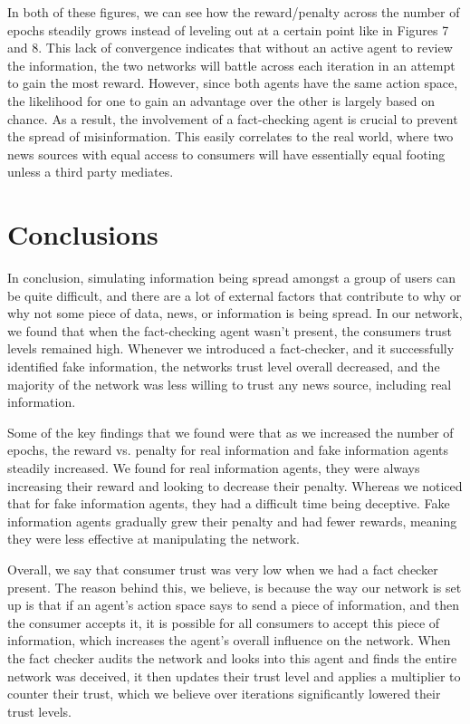\documentclass[twoside]{article}
\begin{document}
 In both of these figures, we can see how the reward/penalty across the number of epochs steadily grows instead of leveling out at a certain point like in Figures 7 and 8. This lack of convergence indicates that without an active agent to review the information, the two networks will battle across each iteration in an attempt to gain the most reward. However, since both agents have the same action space, the likelihood for one to gain an advantage over the other is largely based on chance. As a result, the involvement of a fact-checking agent is crucial to prevent the spread of misinformation. This easily correlates to the real world, where two news sources with equal access to consumers will have essentially equal footing unless a third party mediates.

 \pagebreak
\section{Conclusions}
In conclusion, simulating information being spread amongst a group of users can be quite difficult, and there are a lot of external factors that contribute to why or why not some piece of data, news, or information is being spread. In our network, we found that when the fact-checking agent wasn't present, the consumers trust levels remained high. Whenever we introduced a fact-checker, and it successfully identified fake information, the networks trust level overall decreased, and the majority of the network was less willing to trust any news source, including real information.

Some of the key findings that we found were that as we increased the number of epochs, the reward vs. penalty for real information and fake information agents steadily increased. We found for real information agents, they were always increasing their reward and looking to decrease their penalty. Whereas we noticed that for fake information agents, they had a difficult time being deceptive. Fake information agents gradually grew their penalty and had fewer rewards, meaning they were less effective at manipulating the network. 

Overall, we say that consumer trust was very low when we had a fact checker present. The reason behind this, we believe, is because the way our network is set up is that if an agent's action space says to send a piece of information, and then the consumer accepts it, it is possible for all consumers to accept this piece of information, which increases the agent's overall influence on the network. When the fact checker audits the network and looks into this agent and finds the entire network was deceived, it then updates their trust level and applies a multiplier to counter their trust, which we believe over iterations significantly lowered their trust levels.
\end{document}
